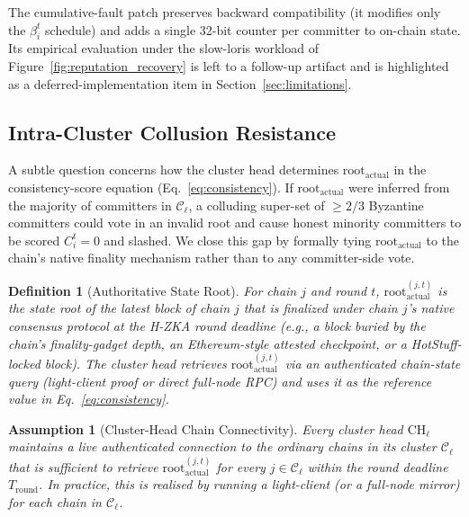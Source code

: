 \documentclass[journal]{IEEEtran}
\newtheorem{definition}{Definition}
\newtheorem{assumption}{Assumption}
\begin{document}
The cumulative-fault patch preserves backward compatibility (it modifies only the $\beta_i^{t}$ schedule) and adds a single 32-bit counter per committer to on-chain state. Its empirical evaluation under the slow-loris workload of Figure~\ref{fig:reputation_recovery} is left to a follow-up artifact and is highlighted as a deferred-implementation item in Section~\ref{sec:limitations}.

\subsection{Intra-Cluster Collusion Resistance}
\label{sec:collusion-resistance}

A subtle question concerns how the cluster head determines $\text{root}_{\text{actual}}$ in the consistency-score equation (Eq.~\ref{eq:consistency}). If $\text{root}_{\text{actual}}$ were inferred from the majority of committers in $\mathcal{C}_\ell$, a colluding super-set of $\geq 2/3$ Byzantine committers could vote in an invalid root and cause honest minority committers to be scored $C_i^{t}=0$ and slashed. We close this gap by formally tying $\text{root}_{\text{actual}}$ to the chain's native finality mechanism rather than to any committer-side vote.

\begin{definition}[Authoritative State Root]
\label{def:rootactual}
For chain $j$ and round $t$, $\text{root}_{\text{actual}}^{(j,t)}$ is the state root of the latest block of chain $j$ that is finalized under chain $j$'s native consensus protocol at the H-ZKA round deadline (e.g., a block buried by the chain's finality-gadget depth, an Ethereum-style attested checkpoint, or a HotStuff-locked block). The cluster head retrieves $\text{root}_{\text{actual}}^{(j,t)}$ via an authenticated chain-state query (light-client proof or direct full-node RPC) and uses it as the reference value in Eq.~\ref{eq:consistency}.
\end{definition}

\begin{assumption}[Cluster-Head Chain Connectivity]
\label{assum:connectivity}
Every cluster head $\text{CH}_\ell$ maintains a live authenticated connection to the ordinary chains in its cluster $\mathcal{C}_\ell$ that is sufficient to retrieve $\text{root}_{\text{actual}}^{(j,t)}$ for every $j \in \mathcal{C}_\ell$ within the round deadline $T_{\mathrm{round}}$. In practice, this is realised by running a light-client (or a full-node mirror) for each chain in $\mathcal{C}_\ell$.
\end{assumption}
\end{document}
